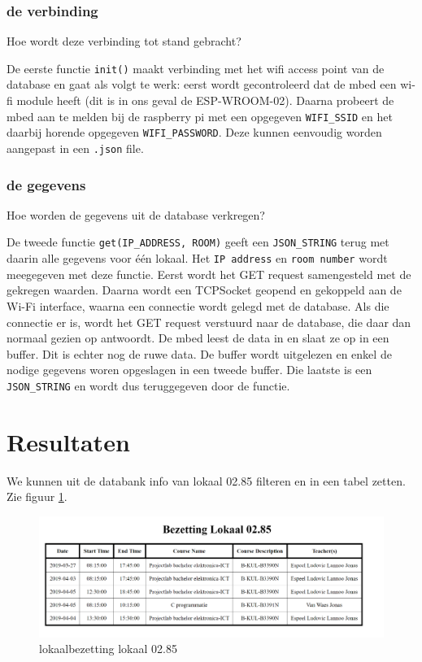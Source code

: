 \documentclass[a4paper,kul]{kulakarticle} %
\begin{document}
\subsubsection{de verbinding}

Hoe wordt deze verbinding tot stand gebracht?

De eerste functie \verb|init()| maakt verbinding met het wifi access point van de database en gaat als volgt te werk: eerst wordt gecontroleerd dat de mbed een wi-fi module heeft (dit is in ons geval de ESP-WROOM-02). Daarna probeert de mbed aan te melden bij de raspberry pi met een opgegeven \verb|WIFI_SSID| en het daarbij horende opgegeven \verb|WIFI_PASSWORD|. Deze  kunnen eenvoudig worden aangepast in een \verb|.json| file.

\subsubsection{de gegevens}

Hoe worden de gegevens uit de database verkregen?

De tweede functie \verb|get(IP_ADDRESS, ROOM)| geeft een \verb|JSON_STRING| terug met daarin alle gegevens voor één lokaal. Het \verb|IP address| en \verb|room number| wordt meegegeven met deze functie. Eerst wordt het GET request samengesteld met de gekregen waarden. Daarna wordt een TCPSocket geopend en gekoppeld aan de Wi-Fi interface, waarna een connectie wordt gelegd met de database. Als die connectie er is, wordt het GET request verstuurd naar de database, die daar dan normaal gezien op antwoordt. De mbed leest de data in en slaat ze op in een buffer. Dit is echter nog de ruwe data. De buffer wordt uitgelezen en enkel de nodige gegevens woren opgeslagen in een tweede buffer. Die laatste is een \verb|JSON_STRING| en wordt dus teruggegeven door de functie.

\section{Resultaten}

We kunnen uit de databank info van lokaal 02.85 filteren en in een tabel zetten. Zie figuur \ref{fig:vboutput}.

\begin{figure}[h]
	\centering
	\includegraphics[width=1\textwidth]{vbDatabank}
	\caption{lokaalbezetting lokaal 02.85}
	\label{fig:vboutput}
\end{figure}
\end{document}
